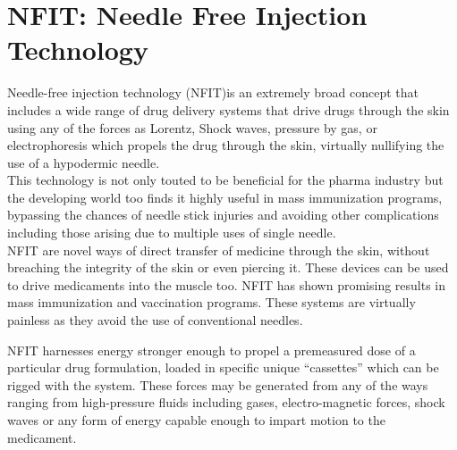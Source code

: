 \documentclass[12pt]{article}
\begin{document}
\newpage

\section{NFIT: Needle Free Injection Technology}

Needle-free injection technology (NFIT)is an extremely broad concept that includes a wide range of drug delivery systems that drive drugs through the skin using any of the forces as Lorentz, Shock waves, pressure by gas, or electrophoresis which propels the drug through the skin, virtually nullifying the use of a hypodermic needle.
\\
This technology is not only touted to be beneficial for the pharma industry but the developing world too finds it highly useful in mass immunization programs, bypassing the chances of needle stick injuries and avoiding other complications including those arising due to multiple uses of single needle.
\\
NFIT are novel ways of direct transfer of medicine through the skin, without breaching the integrity of the skin or even piercing it. These devices can be used to drive medicaments into the muscle too. NFIT has shown promising results in mass immunization and vaccination programs. These systems are virtually painless as they avoid the use of conventional needles.

\indent

NFIT harnesses energy stronger enough to propel a premeasured dose of a particular drug formulation, loaded in specific unique “cassettes” which can be rigged with the system. These forces may be generated from any of the ways ranging from high-pressure fluids including gases, electro-magnetic forces, shock waves or any form of energy capable enough to impart motion to the medicament.

\indent
\end{document}

